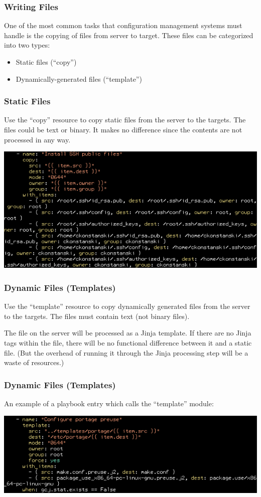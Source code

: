 \documentclass[helvetica,english,utf8,notitle,nologo]{beamer}
\begin{document}
\begin{frame}
  \frametitle{Writing Files}

  One of the most common tasks that configuration management systems
  must handle is the copying of files from server to target. These
  files can be categorized into two types:

  \begin{itemize}
  \item Static files (``copy'')
  \item Dynamically-generated files (``template'')
  \end{itemize}
\end{frame}

\begin{frame}
  \frametitle{Static Files}

  Use the ``copy'' resource to copy static files from the server to
  the targets. The files could be text or binary. It makes no
  difference since the contents are not processed in any way.

  \includegraphics[scale=0.44]{img_20}
\end{frame}

\begin{frame}
  \frametitle{Dynamic Files (Templates)}

  Use the ``template'' resource to copy dynamically generated files
  from the server to the targets. The files must contain text (not
  binary files).

  The file on the server will be processed as a Jinja template. If
  there are no Jinja tags within the file, there will be no functional
  difference between it and a static file. (But the overhead of
  running it through the Jinja processing step will be a waste of
  resources.)
\end{frame}

\begin{frame}
  \frametitle{Dynamic Files (Templates)}

  An example of a playbook entry which calls the ``template'' module:

  \includegraphics[scale=0.44]{img_21}
\end{frame}
\end{document}
